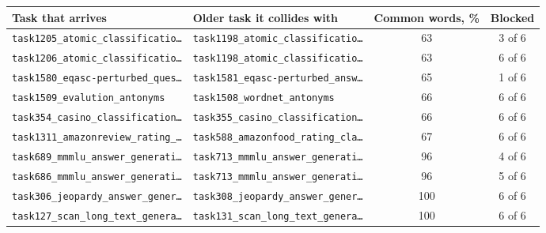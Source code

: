 \begin{tabular}{llcc}
    \toprule
    Task that arrives & Older task it collides with & Common words, \% & Blocked \\
    \midrule
    \texttt{task1205\_atomic\_classificatio\ldots} & \texttt{task1198\_atomic\_classificatio\ldots} & 63 & 3 of 6 \\
    \texttt{task1206\_atomic\_classificatio\ldots} & \texttt{task1198\_atomic\_classificatio\ldots} & 63 & 6 of 6 \\
    \texttt{task1580\_eqasc-perturbed\_ques\ldots} & \texttt{task1581\_eqasc-perturbed\_answ\ldots} & 65 & 1 of 6 \\
    \texttt{task1509\_evalution\_antonyms} & \texttt{task1508\_wordnet\_antonyms} & 66 & 6 of 6 \\
    \texttt{task354\_casino\_classification\ldots} & \texttt{task355\_casino\_classification\ldots} & 66 & 6 of 6 \\
    \texttt{task1311\_amazonreview\_rating\_\ldots} & \texttt{task588\_amazonfood\_rating\_cla\ldots} & 67 & 6 of 6 \\
    \midrule
    \texttt{task689\_mmmlu\_answer\_generati\ldots} & \texttt{task713\_mmmlu\_answer\_generati\ldots} & 96 & 4 of 6 \\
    \texttt{task686\_mmmlu\_answer\_generati\ldots} & \texttt{task713\_mmmlu\_answer\_generati\ldots} & 96 & 5 of 6 \\
    \texttt{task306\_jeopardy\_answer\_gener\ldots} & \texttt{task308\_jeopardy\_answer\_gener\ldots} & 100 & 6 of 6 \\
    \texttt{task127\_scan\_long\_text\_genera\ldots} & \texttt{task131\_scan\_long\_text\_genera\ldots} & 100 & 6 of 6 \\
    \bottomrule
\end{tabular}
